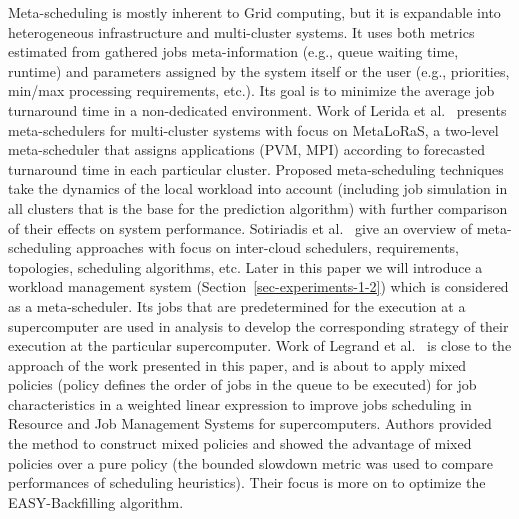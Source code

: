 Meta-scheduling is mostly inherent to Grid computing, but it is expandable into heterogeneous infrastructure and multi-cluster systems. It uses both metrics estimated from gathered jobs meta-information (e.g., queue waiting time, runtime) and parameters assigned by the system itself or the user (e.g., priorities, min/max processing requirements, etc.). Its goal is to minimize the average job turnaround time in a non-dedicated environment. Work of Lerida et al.~\cite{ref-lerida} presents meta-schedulers for multi-cluster systems with focus on MetaLoRaS, a two-level meta-scheduler that assigns applications (PVM, MPI) according to forecasted turnaround time in each particular cluster. Proposed meta-scheduling techniques take the dynamics of the local workload into account (including job simulation in all clusters that is the base for the prediction algorithm) with further comparison of their effects on system performance. Sotiriadis et al.~\cite{ref-sotiriadis} give an overview of meta-scheduling approaches with focus on inter-cloud schedulers, requirements, topologies, scheduling algorithms, etc. Later in this paper we will introduce a workload management system (Section~\ref{sec-experiments-1-2}) which is considered as a meta-scheduler. Its jobs that are predetermined for the execution at a supercomputer are used in analysis to develop the corresponding strategy of their execution at the particular supercomputer. Work of Legrand et al.~\cite{ref-legrand} is close to the approach of the work presented in this paper, and is about to apply mixed policies (policy defines the order of jobs in the queue to be executed) for job characteristics in a weighted linear expression to improve jobs scheduling in Resource and Job Management Systems for supercomputers. Authors provided the method to construct mixed policies and showed the advantage of mixed policies over a pure policy (the bounded slowdown metric was used to compare performances of scheduling heuristics). Their focus is more on to optimize the EASY-Backfilling algorithm.
